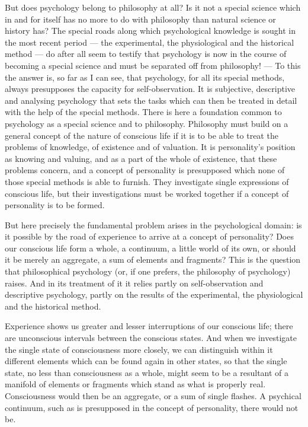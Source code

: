 \documentclass[12pt,a4paper]{book}
\newcommand{\opage}[1]{\marginnote{\footnotesize\textit{[#1]}}}
\begin{document}
But does psychology belong to philosophy at all? Is it not a special science
which in and for itself has no more to do with philosophy than natural science
or history has? The special roads along which psychological knowledge is sought
in the most recent period --- the experimental, the physiological and the
historical method --- do after all seem to testify that psychology is now in the
course of becoming a special science and must be separated off from philosophy!
--- To this the answer is, so far as I can see, that psychology, for all its
special methods, always presupposes the capacity for self-observation. It is
subjective, descriptive and analysing psychology that sets the tasks which can
then be treated in detail with the help of the special methods. There is here a
foundation common to psychology as a special science and to philosophy.
Philosophy must build on a general concept of the nature of conscious life if it
is to be able to treat the problems of knowledge, of existence and of valuation.
It is personality's position as knowing and valuing, and as a part of the whole
of existence, that these problems concern, and a concept of personality is
presupposed which none of those special methods is able to furnish. They
investigate single expressions of conscious life, but their investigations must
be worked together if a concept of personality is to be formed.

But here precisely the fundamental problem arises in the psychological domain:
is it possible by the road of experience to arrive at a concept of personality?
Does our conscious life form a whole, a continuum, a little world of its own, or
should it be merely an aggregate, a sum of elements and fragments? This is the
question that philosophical psychology (or, if one prefers, the philosophy of
psychology) raises. And in its treatment of it it relies partly on
self-observation and descriptive psychology, partly on the results of the
experimental, the physiological and the historical method.

Experience shows us greater and lesser interruptions of our conscious life;
there are unconscious intervals between the conscious states. And when we
investigate the single \opage{8}state of consciousness more closely, we can distinguish
within it different elements which can be found again in other states, so that
the single state, no less than consciousness as a whole, might seem to be a
resultant of a manifold of elements or fragments which stand as what is properly
real. Consciousness would then be an aggregate, or a sum of single flashes. A
psychical continuum, such as is presupposed in the concept of personality, there
would not be.
\end{document}
